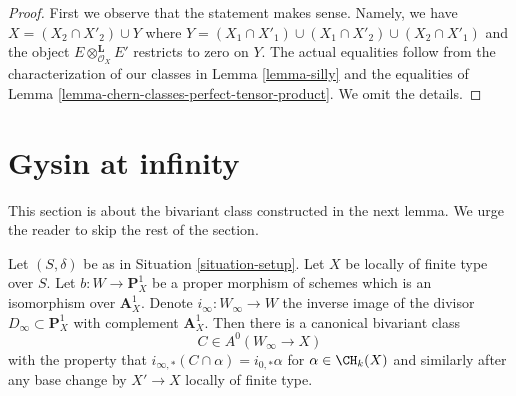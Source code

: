\begin{proof}
First we observe that the statement makes sense. Namely, we have
$X = (X_2 \cap X'_2) \cup Y$ where
$Y = (X_1 \cap X'_1) \cup (X_1 \cap X'_2) \cup (X_2 \cap X'_1)$
and the object $E \otimes_{\mathcal{O}_X}^\mathbf{L} E'$
restricts to zero on $Y$.
The actual equalities follow from the characterization
of our classes in Lemma \ref{lemma-silly}
and the equalities of Lemma \ref{lemma-chern-classes-perfect-tensor-product}.
We omit the details.
\end{proof}







\section{Gysin at infinity}
\label{section-gysin-at-infty}

\noindent
This section is about the bivariant class constructed in the next
lemma. We urge the reader to skip the rest of the section.

\begin{lemma}
\label{lemma-gysin-at-infty}
Let $(S, \delta)$ be as in Situation \ref{situation-setup}.
Let $X$ be locally of finite type over $S$. Let
$b : W \to \mathbf{P}^1_X$ be a proper morphism of schemes
which is an isomorphism over $\mathbf{A}^1_X$.
Denote $i_\infty : W_\infty \to W$ the inverse image of the divisor
$D_\infty \subset \mathbf{P}^1_X$ with complement $\mathbf{A}^1_X$.
Then there is a canonical bivariant class
$$
C \in A^0(W_\infty \to X)
$$
with the property that
$i_{\infty, *}(C \cap \alpha) = i_{0, *}\alpha$
for $\alpha \in \CH_k(X)$ and similarly after any base change by
$X' \to X$ locally of finite type.
\end{lemma}

